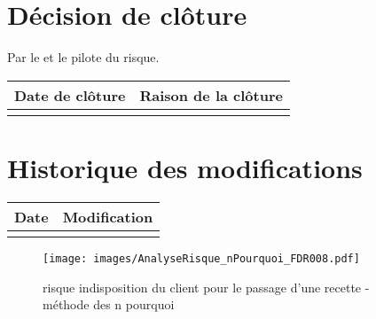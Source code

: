 \section*{Décision de clôture}
Par le \CP{} et le pilote du risque.
\begin{table}[H]
\centering
	\begin{tabularx}{16.8cm}{|X|X|}
	\hline
	\rowcolor{gray!40} Date de clôture & Raison de la clôture \\
	\hline
	  & \\
	\hline
	\end{tabularx}
\end{table}

\section*{Historique des modifications}
\begin{table}[H]
\centering
	\begin{tabularx}{16.8cm}{|X|X|}
	\hline
	Date & Modification \\
	\hline
	  & \\
	\hline
	\end{tabularx}
\end{table}
\newpage

\begin{landscape}
\begin{figure}
	\centering
	\texttt{[image: images/AnalyseRisque\_nPourquoi\_FDR008.pdf]}
	\caption{\label{risque indisposition client}risque indisposition du client pour le passage d'une recette - méthode des n pourquoi}
\end{figure}
\end{landscape}